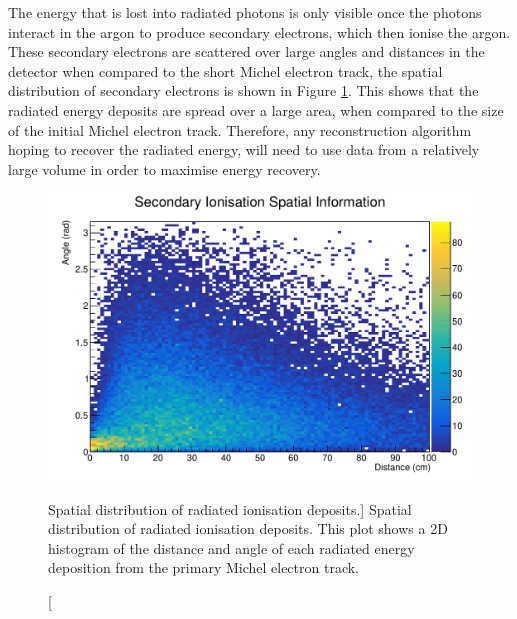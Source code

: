 The energy that is lost into radiated photons is only visible once the photons
interact in the argon to produce secondary electrons, which then ionise the
argon. These secondary electrons are scattered over large angles and distances
in the detector when compared to the short Michel electron track, the spatial 
distribution of secondary electrons is shown in Figure \ref{fig:photon_geom}.
This shows that the radiated energy deposits are spread over a large area, when
compared to the size of the initial Michel electron track. Therefore, any 
reconstruction algorithm hoping to recover the radiated energy, will 
need to use data from a relatively large volume in order to maximise energy
recovery.
\begin{figure}
	\centering
	\includegraphics[width=\textwidth]{figures/photon_geom.pdf}
	\caption
	[Spatial distribution of radiated ionisation deposits.]
	{Spatial distribution of radiated ionisation deposits. This plot shows a
	2D histogram of the distance and angle of each radiated energy deposition 
	from the primary Michel electron track.}
	\label{fig:photon_geom}
\end{figure}

